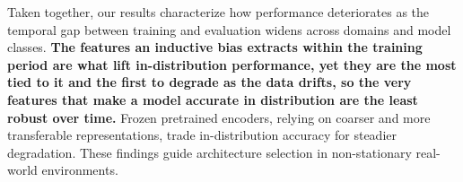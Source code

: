 \noindent Taken together, our results characterize how performance deteriorates as the temporal gap between training and evaluation widens across domains and model classes. \textbf{The features an inductive bias extracts within the training period are what lift in-distribution performance, yet they are the most tied to it and the first to degrade as the data drifts, so the very features that make a model accurate in distribution are the least robust over time.} Frozen pretrained encoders, relying on coarser and more transferable representations, trade in-distribution accuracy for steadier degradation. These findings guide architecture selection in non-stationary real-world environments.
